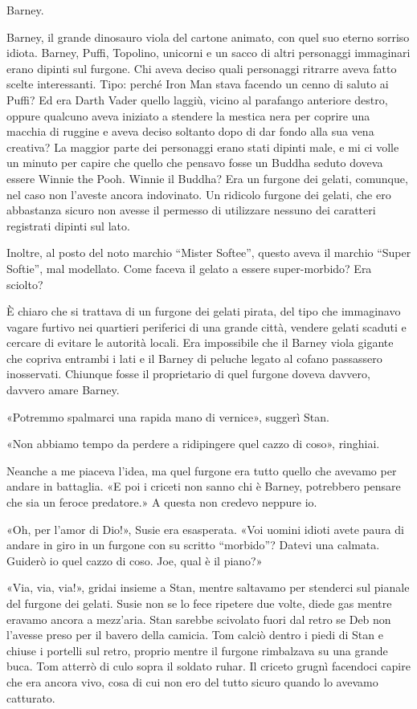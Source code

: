 Barney.

Barney, il grande dinosauro viola del cartone animato, con quel suo
eterno sorriso idiota. Barney, Puffi, Topolino, unicorni e un sacco di
altri personaggi immaginari erano dipinti sul furgone. Chi aveva deciso
quali personaggi ritrarre aveva fatto scelte interessanti. Tipo: perché
Iron Man stava facendo un cenno di saluto ai Puffi? Ed era Darth Vader
quello laggiù, vicino al parafango anteriore destro, oppure qualcuno
aveva iniziato a stendere la mestica nera per coprire una macchia di
ruggine e aveva deciso soltanto dopo di dar fondo alla sua vena
creativa? La maggior parte dei personaggi erano stati dipinti male, e mi
ci volle un minuto per capire che quello che pensavo fosse un Buddha
seduto doveva essere Winnie the Pooh. Winnie il Buddha? Era un furgone
dei gelati, comunque, nel caso non l'aveste ancora indovinato. Un
ridicolo furgone dei gelati, che ero abbastanza sicuro non avesse il
permesso di utilizzare nessuno dei caratteri registrati dipinti sul
lato.

Inoltre, al posto del noto marchio ``Mister Softee'', questo aveva il
marchio ``Super Softie'', mal modellato. Come faceva il gelato a essere
super-morbido? Era sciolto?

È chiaro che si trattava di un furgone dei gelati pirata, del tipo che
immaginavo vagare furtivo nei quartieri periferici di una grande città,
vendere gelati scaduti e cercare di evitare le autorità locali. Era
impossibile che il Barney viola gigante che copriva entrambi i lati e il
Barney di peluche legato al cofano passassero inosservati. Chiunque
fosse il proprietario di quel furgone doveva davvero, davvero amare
Barney.

«Potremmo spalmarci una rapida mano di vernice», suggerì Stan.

«Non abbiamo tempo da perdere a ridipingere quel cazzo di coso»,
ringhiai.

Neanche a me piaceva l'idea, ma quel furgone era tutto quello che
avevamo per andare in battaglia. «E poi i criceti non sanno chi è
Barney, potrebbero pensare che sia un feroce predatore.» A questa non
credevo neppure io.

«Oh, per l'amor di Dio!», Susie era esasperata. «Voi uomini idioti avete
paura di andare in giro in un furgone con su scritto ``morbido''? Datevi
una calmata. Guiderò io quel cazzo di coso. Joe, qual è il piano?»

\hfill\break

«Via, via, via!», gridai insieme a Stan, mentre saltavamo per stenderci
sul pianale del furgone dei gelati. Susie non se lo fece ripetere due
volte, diede gas mentre eravamo ancora a mezz'aria. Stan sarebbe
scivolato fuori dal retro se Deb non l'avesse preso per il bavero della
camicia. Tom calciò dentro i piedi di Stan e chiuse i portelli sul
retro, proprio mentre il furgone rimbalzava su una grande buca. Tom
atterrò di culo sopra il soldato ruhar. Il criceto grugnì facendoci
capire che era ancora vivo, cosa di cui non ero del tutto sicuro quando
lo avevamo catturato.

